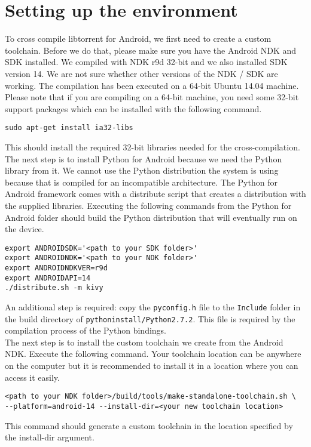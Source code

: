 \section{Setting up the environment}
	To cross compile libtorrent for Android, we first need to create a custom toolchain. Before we do that, please make sure you have the Android NDK and SDK installed. We compiled with NDK r9d 32-bit and we also installed SDK version 14. We are not sure whether other versions of the NDK / SDK are working. The compilation has been executed on a 64-bit Ubuntu 14.04 machine. Please note that if you are compiling on a 64-bit machine, you need some 32-bit support packages which can be installed with the following command.
	\begin{lstlisting}
sudo apt-get install ia32-libs
	\end{lstlisting}
	This should install the required 32-bit libraries needed for the cross-compilation. The next step is to install Python for Android because we need the Python library from it. We cannot use the Python distribution the system is using because that is compiled for an incompatible architecture. The Python for Android framework comes with a distribute script that creates a distribution with the supplied libraries. Executing the following commands from the Python for Android folder should build the Python distribution that will eventually run on the device.
	\begin{lstlisting}
export ANDROIDSDK='<path to your SDK folder>'
export ANDROIDNDK='<path to your NDK folder>'
export ANDROIDNDKVER=r9d
export ANDROIDAPI=14
./distribute.sh -m kivy
	\end{lstlisting}
	An additional step is required: copy the \texttt{pyconfig.h} file to the \texttt{Include} folder in the build directory of \texttt{pythoninstall/Python2.7.2}. This file is required by the compilation process of the Python bindings.\\
	The next step is to install the custom toolchain we create from the Android NDK. Execute the following command. Your toolchain location can be anywhere on the computer but it is recommended to install it in a location where you can access it easily.
	\begin{lstlisting}
<path to your NDK folder>/build/tools/make-standalone-toolchain.sh \
--platform=android-14 --install-dir=<your new toolchain location>
	\end{lstlisting}
	This command should generate a custom toolchain in the location specified by the install-dir argument.\\
